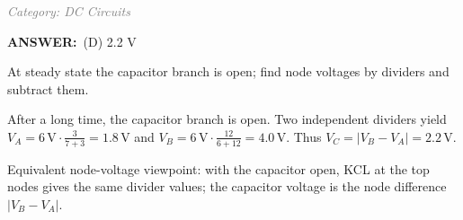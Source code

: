 ﻿\documentclass[12pt, a4paper]{article}
\makeatletter
\newcommand{\finalanswer}[1]{\textbf{ANSWER:}~#1}
\newif\if@categoryprinted
\newcommand{\category}[1]{\if@categoryprinted\relax\else\textit{\textcolor{gray}{Category: #1}}\global\@categoryprintedtrue\fi}
\makeatother
\begin{document}
\begin{CJK*}{UTF8}{gbsn}
\begin{enumerate}[itemsep=1.0em, topsep=0.6em]
\category{DC Circuits}
\begin{answerbox}
\finalanswer{(D) 2.2 V}
\end{answerbox}
\begin{insightbox}
At steady state the capacitor branch is open; find node voltages by dividers and subtract them.
\end{insightbox}
\begin{solutionbox}

After a long time, the capacitor branch is open. Two independent dividers yield $V_A = 6\,\text{V}\cdot\tfrac{3}{7+3} = 1.8\,\text{V}$ and $V_B = 6\,\text{V}\cdot\tfrac{12}{6+12} = 4.0\,\text{V}$. Thus $V_C = |V_B-V_A| = 2.2\,\text{V}$.
\par\smallskip Equivalent node-voltage viewpoint: with the capacitor open, KCL at the top nodes gives the same divider values; the capacitor voltage is the node difference $|V_B-V_A|$.
\end{solutionbox}


\end{enumerate}
\end{CJK*}
\end{document}
